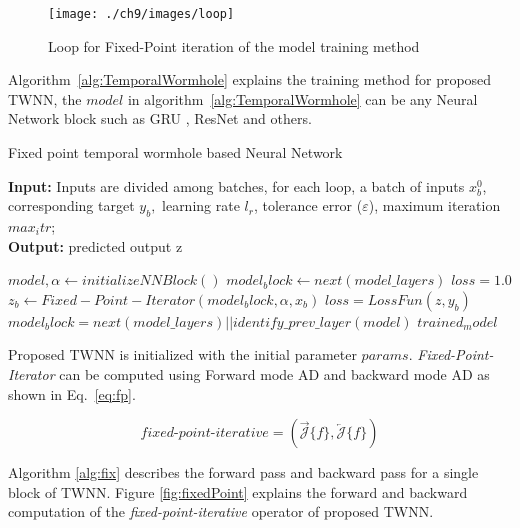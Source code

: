 \documentclass{article}
\begin{document}
\begin{figure}[ht]
  \centering
  \texttt{[image: ./ch9/images/loop]}
  \caption{Loop for Fixed-Point iteration of the model training method}
  \label{fig:loop}
\end{figure}
Algorithm~\ref{alg:TemporalWormhole} explains the training method for proposed TWNN, the $model$ in algorithm~\ref{alg:TemporalWormhole} can be any Neural Network block such as GRU \cite{dey2017gate}, ResNet \cite{keeler1994residual} and others. 
\begin{algorithm}
	\caption{Fixed point temporal wormhole based Neural Network}
	\hspace*{\algorithmicindent} \textbf{Input:} Inputs are divided among batches, for each loop, a batch of inputs $x^{0}_{b}$, corresponding target $y_{b}, $ learning rate $l_{r}$, tolerance error ($\varepsilon$), maximum iteration $max_itr$;    \\
	\hspace*{\algorithmicindent} \textbf{Output:} predicted output z
	\begin{algorithmic}[1]
		\State  $ model, \alpha \leftarrow initializeNNBlock()$
		\State $model_block \leftarrow next(model\_layers)$
		\State $loss = 1.0$
			        \State  $ z_{b} \leftarrow Fixed-Point-Iterator(model_block, \alpha, x_{b} )$
			        \State $ loss = LossFun(z, y_{b})$
			    \State $model_block = next(model\_layers) || identify\_prev\_layer(model) $
			\EndWhile
		\EndFor
		\Return $ trained_model	$ \\
		\EndProcedure

	\end{algorithmic}
	\label{alg:TemporalWormhole}
\end{algorithm}

Proposed TWNN is initialized with the initial parameter $params$. \emph{Fixed-Point-Iterator} can be computed using Forward mode AD and backward mode AD as shown in Eq.~\eqref{eq:fp}.

\begin{equation}
	\textit{fixed-point-iterative} = (\overrightarrow{\mathcal{J}}\{f\},\overleftarrow{\mathcal{J}}\{f\})
\label{eq:fp}
\end{equation}

Algorithm \ref{alg:fix} describes the forward pass and backward pass for a single block of TWNN. Figure \ref{fig:fixedPoint} explains the forward and backward computation of the \emph{fixed-point-iterative} operator of proposed TWNN.
\end{document}
